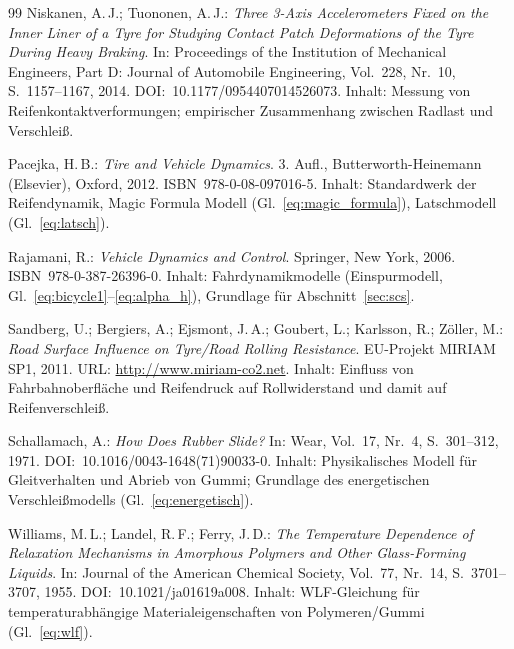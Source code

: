 ﻿\documentclass[12pt,a4paper]{article}
\theoremstyle{definition}
\theoremstyle{remark}
\begin{document}
\begin{thebibliography}{99}
Niskanen, A.\,J.; Tuononen, A.\,J.:
\textit{Three 3-Axis Accelerometers Fixed on the Inner Liner of a Tyre for
Studying Contact Patch Deformations of the Tyre During Heavy Braking}.
In: Proceedings of the Institution of Mechanical Engineers, Part D:
Journal of Automobile Engineering, Vol.~228, Nr.~10, S.~1157--1167, 2014.
DOI:~10.1177/0954407014526073.
Inhalt: Messung von Reifenkontaktverformungen; empirischer Zusammenhang
zwischen Radlast und Verschleiß.

Pacejka, H.\,B.: \textit{Tire and Vehicle Dynamics}. 3. Aufl.,
Butterworth-Heinemann (Elsevier), Oxford, 2012. ISBN~978-0-08-097016-5.
Inhalt: Standardwerk der Reifendynamik, Magic Formula Modell (Gl.~\ref{eq:magic_formula}),
Latschmodell (Gl.~\ref{eq:latsch}).

Rajamani, R.: \textit{Vehicle Dynamics and Control}.
Springer, New York, 2006. ISBN~978-0-387-26396-0.
Inhalt: Fahrdynamikmodelle (Einspurmodell, Gl.~\ref{eq:bicycle1}--\ref{eq:alpha_h}),
Grundlage für Abschnitt~\ref{sec:scs}.

Sandberg, U.; Bergiers, A.; Ejsmont, J.\,A.; Goubert, L.; Karlsson, R.;
Zöller, M.: \textit{Road Surface Influence on Tyre/Road Rolling Resistance}.
EU-Projekt MIRIAM SP1, 2011. URL: \url{http://www.miriam-co2.net}.
Inhalt: Einfluss von Fahrbahnoberfläche und Reifendruck auf Rollwiderstand
und damit auf Reifenverschleiß.

Schallamach, A.: \textit{How Does Rubber Slide?}
In: Wear, Vol.~17, Nr.~4, S.~301--312, 1971.
DOI:~10.1016/0043-1648(71)90033-0.
Inhalt: Physikalisches Modell für Gleitverhalten und Abrieb von Gummi;
Grundlage des energetischen Verschleißmodells (Gl.~\ref{eq:energetisch}).

Williams, M.\,L.; Landel, R.\,F.; Ferry, J.\,D.:
\textit{The Temperature Dependence of Relaxation Mechanisms in Amorphous Polymers
and Other Glass-Forming Liquids}.
In: Journal of the American Chemical Society, Vol.~77, Nr.~14, S.~3701--3707, 1955.
DOI:~10.1021/ja01619a008.
Inhalt: WLF-Gleichung für temperaturabhängige Materialeigenschaften von Polymeren/Gummi
(Gl.~\ref{eq:wlf}).

\end{thebibliography}
\end{document}
